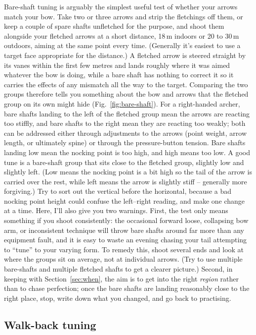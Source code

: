 \documentclass[11pt]{article}
\let\plainsubsection\subsection
\renewcommand{\subsection}{\FloatBarrier\plainsubsection}
\begin{document}
Bare-shaft tuning is arguably the simplest useful test of whether your arrows match your bow. Take two or three arrows and strip the fletchings off them, or keep a couple of spare shafts unfletched for the purpose, and shoot them alongside your fletched arrows at a short distance, 18\,m indoors or 20 to 30\,m outdoors, aiming at the same point every time. (Generally it's easiest to use a target face appropriate for the distance.) A fletched arrow is steered straight by its vanes within the first few metres and lands roughly where it was aimed whatever the bow is doing, while a bare shaft has nothing to correct it so it carries the effects of any mismatch all the way to the target. Comparing the two groups therefore tells you something about the bow and arrows that the fletched group on its own might hide (Fig.~\ref{fig:bare-shaft}). For a right-handed archer, bare shafts landing to the left of the fletched group mean the arrows are reacting too stiffly, and bare shafts to the right mean they are reacting too weakly; both can be addressed either through adjustments to the arrows (point weight, arrow length, or ultimately spine) or through the pressure-button tension. Bare shafts landing low mean the nocking point is too high, and high means too low. A good tune is a bare-shaft group that sits close to the fletched group, slightly low and slightly left. (Low means the nocking point is a bit high so the tail of the arrow is carried over the rest, while left means the arrow is slightly stiff -- generally more forgiving.) Try to sort out the vertical before the horizontal, because a bad nocking point height could confuse the left--right reading, and make one change at a time. Here, I'll also give you two warnings. First, the test only means something if you shoot consistently: the occasional forward loose, collapsing bow arm, or inconsistent technique will throw bare shafts around far more than any equipment fault, and it is easy to waste an evening chasing your tail attempting to ``tune'' to your varying form. To remedy this, shoot several ends and look at where the groups sit on average, not at individual arrows. (Try to use multiple bare-shafts and multiple fletched shafts to get a clearer picture.) Second, in keeping with Section~\ref{sec:when}, the aim is to get into the right \emph{region} rather than to chase perfection; once the bare shafts are landing reasonably close to the right place, stop, write down what you changed, and go back to practising.

\subsection{Walk-back tuning}
\end{document}
